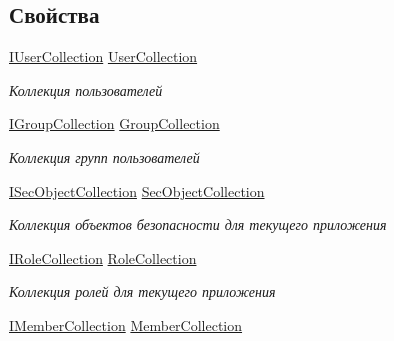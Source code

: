 \subsection*{Свойства}
\begin{DoxyCompactItemize}
\item 
\hyperlink{interface_security_1_1_interfaces_1_1_collections_1_1_i_user_collection}{I\+User\+Collection} \hyperlink{interface_security_1_1_interfaces_1_1_i_security_a5bd4b9391e7f1c2cc7705bc0f5a32eef}{User\+Collection}
\begin{DoxyCompactList}\small\item\em Коллекция пользователей \end{DoxyCompactList}\item 
\hyperlink{interface_security_1_1_interfaces_1_1_collections_1_1_i_group_collection}{I\+Group\+Collection} \hyperlink{interface_security_1_1_interfaces_1_1_i_security_a154a804d2664f3fac46d90c5052a7b4f}{Group\+Collection}
\begin{DoxyCompactList}\small\item\em Коллекция групп пользователей \end{DoxyCompactList}\item 
\hyperlink{interface_security_1_1_interfaces_1_1_collections_1_1_i_sec_object_collection}{I\+Sec\+Object\+Collection} \hyperlink{interface_security_1_1_interfaces_1_1_i_security_a5fabf1db303fcb912908cf6519471204}{Sec\+Object\+Collection}
\begin{DoxyCompactList}\small\item\em Коллекция объектов безопасности для текущего приложения \end{DoxyCompactList}\item 
\hyperlink{interface_security_1_1_interfaces_1_1_collections_1_1_i_role_collection}{I\+Role\+Collection} \hyperlink{interface_security_1_1_interfaces_1_1_i_security_add16f9e37b6c62ebf8ba2b547de93834}{Role\+Collection}
\begin{DoxyCompactList}\small\item\em Коллекция ролей для текущего приложения \end{DoxyCompactList}\item 
\hyperlink{interface_security_1_1_interfaces_1_1_collections_1_1_i_member_collection}{I\+Member\+Collection} \hyperlink{interface_security_1_1_interfaces_1_1_i_security_ab84782b78ce769b283e3c5a95e1fdc68}{Member\+Collection}

\end{DoxyCompactItemize}
